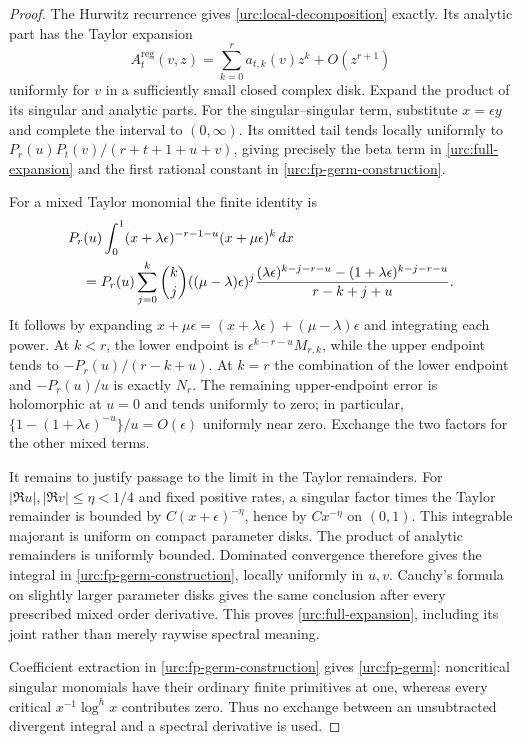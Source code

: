 \documentclass[11pt,a4paper]{article}
\theoremstyle{definition}
\theoremstyle{remark}
\numberwithin{equation}{section}
\begin{document}
\begin{proof}
The Hurwitz recurrence gives \eqref{urc:local-decomposition} exactly.
Its analytic part has the Taylor expansion
\[
 A_t^{\mathrm{reg}}(v,z)=\sum_{k=0}^r a_{t,k}(v)z^k
                              +O(z^{r+1})
\]
uniformly for $v$ in a sufficiently small closed complex disk.
Expand the product of its singular and analytic parts. For the
singular--singular term, substitute $x=\epsilon y$ and complete
the interval to $(0,\infty)$. Its omitted tail tends locally
uniformly to $P_r(u)P_t(v)/(r+t+1+u+v)$, giving precisely the
beta term in \eqref{urc:full-expansion} and the first rational
constant in \eqref{urc:fp-germ-construction}.

For a mixed Taylor monomial the finite identity is
\begin{align}
 &P_r(u)\int_0^1
       (x+\lambda\epsilon)^{-r-1-u}(x+\mu\epsilon)^k\,dx
 \notag\\
 &\quad=P_r(u)\sum_{j=0}^k\binom kj
       ((\mu-\lambda)\epsilon)^j
 \frac{(\lambda\epsilon)^{k-j-r-u}
                  -(1+\lambda\epsilon)^{k-j-r-u}}
      {r-k+j+u}.
 \label{urc:exact-mixed-primitive}
\end{align}
It follows by expanding $x+\mu\epsilon=(x+\lambda\epsilon)
+(\mu-\lambda)\epsilon$ and integrating each power. At $k<r$,
the lower endpoint is $\epsilon^{k-r-u}M_{r,k}$, while the upper
endpoint tends to $-P_r(u)/(r-k+u)$. At $k=r$ the combination of
the lower endpoint and $-P_r(u)/u$ is exactly $N_r$.
The remaining upper-endpoint error is holomorphic at $u=0$ and
tends uniformly to zero; in particular,
$\{1-(1+\lambda\epsilon)^{-u}\}/u=O(\epsilon)$ uniformly near
zero. Exchange the two factors for the other mixed terms.

It remains to justify passage to the limit in the Taylor remainders.
For $|\Re u|,|\Re v|\le\eta<1/4$ and fixed positive rates, a
singular factor times the Taylor remainder is bounded by
$C(x+\epsilon)^{-\eta}$, hence by $Cx^{-\eta}$ on $(0,1)$.
This integrable majorant is uniform on compact parameter disks.
The product of analytic remainders is uniformly bounded. Dominated
convergence therefore gives the integral in
\eqref{urc:fp-germ-construction}, locally uniformly in $u,v$.
Cauchy's formula on slightly larger parameter disks gives the
same conclusion after every prescribed mixed order derivative.
This proves \eqref{urc:full-expansion}, including its joint rather
than merely raywise spectral meaning.

Coefficient extraction in \eqref{urc:fp-germ-construction} gives
\eqref{urc:fp-germ}: noncritical singular monomials have their
ordinary finite primitives at one, whereas every critical
$x^{-1}\log^h x$ contributes zero. Thus no exchange between an
unsubtracted divergent integral and a spectral derivative is used.
\end{proof}
\end{document}
